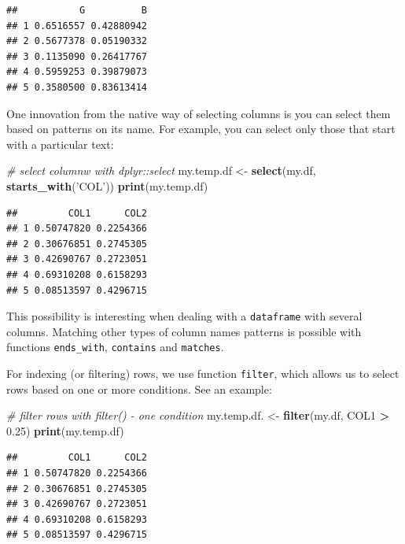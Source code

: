 \documentclass[11pt,]{book}
\newenvironment{Shaded}{\begin{snugshade}}{\end{snugshade}}
\newcommand{\KeywordTok}[1]{\textcolor[rgb]{0.27,0.27,0.27}{\textbf{#1}}}
\newcommand{\FloatTok}[1]{\textcolor[rgb]{0.06,0.06,0.06}{#1}}
\newcommand{\StringTok}[1]{\textcolor[rgb]{0.5,0.5,0.5}{#1}}
\newcommand{\CommentTok}[1]{\textcolor[rgb]{0.56,0.35,0.01}{\textit{#1}}}
\newcommand{\OperatorTok}[1]{\textcolor[rgb]{0.81,0.36,0.00}{\textbf{#1}}}
\newcommand{\NormalTok}[1]{#1}
\begin{document}
\begin{verbatim}
##           G          B
## 1 0.6516557 0.42880942
## 2 0.5677378 0.05190332
## 3 0.1135090 0.26417767
## 4 0.5959253 0.39879073
## 5 0.3580500 0.83613414
\end{verbatim}

One innovation from the native way of selecting columns is you can
select them based on patterns on its name. For example, you can select
only those that start with a particular text:

\begin{Shaded}
\begin{Highlighting}[]
\CommentTok{# select columnw with dplyr::select}
\NormalTok{my.temp.df <-}\StringTok{ }\KeywordTok{select}\NormalTok{(my.df, }\KeywordTok{starts_with}\NormalTok{(}\StringTok{'COL'}\NormalTok{))}
\KeywordTok{print}\NormalTok{(my.temp.df)}
\end{Highlighting}
\end{Shaded}

\begin{verbatim}
##         COL1      COL2
## 1 0.50747820 0.2254366
## 2 0.30676851 0.2745305
## 3 0.42690767 0.2723051
## 4 0.69310208 0.6158293
## 5 0.08513597 0.4296715
\end{verbatim}

This possibility is interesting when dealing with a \texttt{dataframe}
with several columns. Matching other types of column names patterns is
possible with functions \texttt{ends\_with}, \texttt{contains} and
\texttt{matches}.

For indexing (or filtering) rows, we use function \texttt{filter}, which
allows us to select rows based on one or more conditions. See an
example: 

\begin{Shaded}
\begin{Highlighting}[]
\CommentTok{# filter rows with filter() - one condition}
\NormalTok{my.temp.df. <-}\StringTok{ }\KeywordTok{filter}\NormalTok{(my.df, COL1 }\OperatorTok{>}\StringTok{ }\FloatTok{0.25}\NormalTok{)}
\KeywordTok{print}\NormalTok{(my.temp.df)}
\end{Highlighting}
\end{Shaded}

\begin{verbatim}
##         COL1      COL2
## 1 0.50747820 0.2254366
## 2 0.30676851 0.2745305
## 3 0.42690767 0.2723051
## 4 0.69310208 0.6158293
## 5 0.08513597 0.4296715
\end{verbatim}
\end{document}
